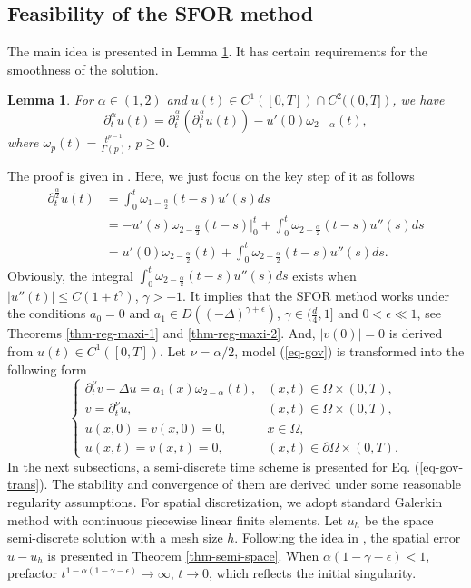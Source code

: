 \documentclass[11pt]{article}
\newtheorem{lemma}{Lemma}[section]
\numberwithin{equation}{section}
\begin{document}
\subsection{Feasibility of the SFOR method}
The main idea is presented in Lemma \ref{lem-sym}. It has certain requirements for the smoothness of the solution.
\begin{lemma}\label{lem-sym}
For $\alpha\in(1,2)$ and $u(t)\in C^1([0,T])\cap C^2((0,T])$, we have
\[
\partial_t^\alpha u(t)=\partial_t^{\frac{\alpha}{2}}(\partial_t^{\frac{\alpha}{2}}u(t))-u'(0)\omega_{2-\alpha}(t),
\]
where $\omega_{p}(t)=\frac{t^{p-1}}{\Gamma{(p)}}$, $p\geq0$.
\end{lemma}
The proof is given in \cite{LyuP2022SFOR}. Here, we just focus on the key step of it as follows
\begin{align*}
\partial_t^{\frac{\alpha}{2}}u(t)
&=\int_0^t\omega_{1-\frac{\alpha}{2}}(t-s)u'(s)ds\\
&=-u'(s)\omega_{2-\frac{\alpha}{2}}(t-s)|_0^t+\int_0^t\omega_{2-\frac{\alpha}{2}}(t-s)u''(s)ds\\
&=u'(0)\omega_{2-\frac{\alpha}{2}}(t)+\int_0^t\omega_{2-\frac{\alpha}{2}}(t-s)u''(s)ds.
\end{align*}
Obviously, the integral $\int_0^t\omega_{2-\frac{\alpha}{2}}(t-s)u''(s)ds$ exists
when $|u''(t)|\le C(1+t^\gamma)$, $\gamma> -1$. It implies that the SFOR method works under the conditions $a_0=0$ and $a_1\in D((-\Delta)^{\gamma+\epsilon})$, $\gamma\in(\frac{d}{4},1]$ and $0<\epsilon \ll 1$, see Theorems \ref{thm-reg-maxi-1} and \ref{thm-reg-maxi-2}. And, $|v(0)|=0$ is derived from $u(t)\in C^1([0,T])$. Let $\nu=\alpha/2$, model (\ref{eq-gov}) is transformed into the following form
\begin{equation}\label{eq-gov-trans}
\begin{cases}
  \partial_t^\nu v - \Delta u = a_1(x)\omega_{2-\alpha}(t), & (x,t) \in \Omega \times (0,T), \\
  v  = \partial_t^\nu u, & (x,t) \in \Omega \times (0,T), \\
  u(x,0) = v(x,0)=0, & x \in \Omega, \\
  u(x,t) = v(x,t)=0, & (x,t) \in \partial \Omega \times (0,T).
\end{cases}
\end{equation}
In the next subsections, a semi-discrete time scheme is presented for Eq. (\ref{eq-gov-trans}). The stability and convergence of them are derived under some reasonable regularity assumptions. For spatial discretization, we adopt standard Galerkin method with continuous piecewise linear finite elements. Let $u_h$ be the space semi-discrete solution with a mesh size $h$. Following the idea in \cite{Jin2016wave}, the spatial error $u-u_h$ is presented in Theorem \ref{thm-semi-space}. When $\alpha(1-\gamma-\epsilon)<1$, prefactor $t^{1-\alpha(1-\gamma-\epsilon)}\rightarrow\infty$, $t\rightarrow0$, which reflects the initial singularity. 
\end{document}
